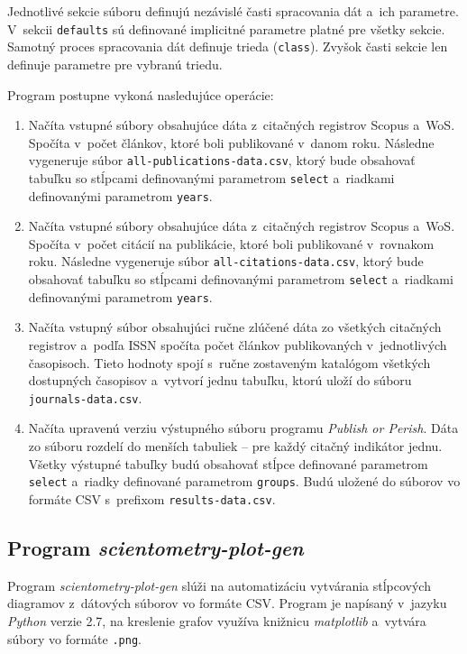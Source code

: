 Jednotlivé sekcie súboru definujú nezávislé časti spracovania dát a~ich
parametre.  V~sekcii \verb|defaults| sú definované implicitné parametre platné
pre všetky sekcie.  Samotný proces spracovania dát definuje trieda
(\verb|class|).  Zvyšok časti sekcie len definuje parametre pre vybranú triedu.

Program postupne vykoná nasledujúce operácie:

\begin{enumerate}
\item Načíta vstupné súbory obsahujúce dáta z~citačných registrov Scopus a~WoS.
  Spočíta v~počet článkov, ktoré boli publikované v~danom roku.  Následne
  vygeneruje súbor \verb|all-publications-data.csv|, ktorý bude obsahovať
  tabuľku so stĺpcami definovanými parametrom \verb|select| a~riadkami
  definovanými parametrom \verb|years|.
\item Načíta vstupné súbory obsahujúce dáta z~citačných registrov Scopus a~WoS.
  Spočíta v~počet citácií na publikácie, ktoré boli publikované v~rovnakom roku.
  Následne vygeneruje súbor \verb|all-citations-data.csv|, ktorý bude obsahovať
  tabuľku so stĺpcami definovanými parametrom \verb|select| a~riadkami
  definovanými parametrom \verb|years|.
\item Načíta vstupný súbor obsahujúci ručne zlúčené dáta zo všetkých citačných
  registrov a~podľa ISSN spočíta počet článkov publikovaných v~jednotlivých
  časopisoch.  Tieto hodnoty spojí s~ručne zostaveným katalógom všetkých
  dostupných časopisov a~vytvorí jednu tabuľku, ktorú uloží do súboru
  \verb|journals-data.csv|.
\item Načíta upravenú verziu výstupného súboru programu \emph{Publish or
    Perish}.  Dáta zo súboru rozdelí do menších tabuliek -- pre každý citačný
  indikátor jednu.  Všetky výstupné tabuľky budú obsahovať stĺpce definované
  parametrom \verb|select| a~riadky definované parametrom \verb|groups|.  Budú
  uložené do súborov vo formáte CSV s~prefixom \verb|results-data.csv|.
\end{enumerate}


\subsection*{Program \emph{scientometry-plot-gen}}

Program \emph{scientometry-plot-gen} slúži na automatizáciu vytvárania
stĺpcových diagramov z~dátových súborov vo formáte CSV.  Program je napísaný
v~jazyku \emph{Python} verzie 2.7, na kreslenie grafov využíva knižnicu
\emph{matplotlib} a~vytvára súbory vo formáte \texttt{.png}.

